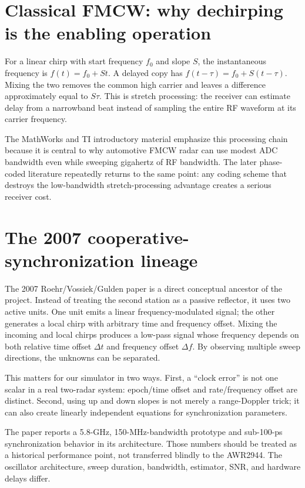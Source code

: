 \documentclass[11pt]{article}
\begin{document}
\section{Classical FMCW: why dechirping is the enabling operation}
For a linear chirp with start frequency $f_0$ and slope $S$, the instantaneous frequency is $f(t)=f_0+St$. A delayed copy has $f(t-\tau)=f_0+S(t-\tau)$. Mixing the two removes the common high carrier and leaves a difference approximately equal to $S\tau$. This is stretch processing: the receiver can estimate delay from a narrowband beat instead of sampling the entire RF waveform at its carrier frequency.

The MathWorks and TI introductory material emphasize this processing chain because it is central to why automotive FMCW radar can use modest ADC bandwidth even while sweeping gigahertz of RF bandwidth. The later phase-coded literature repeatedly returns to the same point: any coding scheme that destroys the low-bandwidth stretch-processing advantage creates a serious receiver cost.

\section{The 2007 cooperative-synchronization lineage}
The 2007 Roehr/Vossiek/Gulden paper is a direct conceptual ancestor of the project. Instead of treating the second station as a passive reflector, it uses two active units. One unit emits a linear frequency-modulated signal; the other generates a local chirp with arbitrary time and frequency offset. Mixing the incoming and local chirps produces a low-pass signal whose frequency depends on both relative time offset $\Delta t$ and frequency offset $\Delta f$. By observing multiple sweep directions, the unknowns can be separated.

This matters for our simulator in two ways. First, a ``clock error'' is not one scalar in a real two-radar system: epoch/time offset and rate/frequency offset are distinct. Second, using up and down slopes is not merely a range-Doppler trick; it can also create linearly independent equations for synchronization parameters.

The paper reports a 5.8-GHz, 150-MHz-bandwidth prototype and sub-100-ps synchronization behavior in its architecture. Those numbers should be treated as a historical performance point, not transferred blindly to the AWR2944. The oscillator architecture, sweep duration, bandwidth, estimator, SNR, and hardware delays differ.
\end{document}
